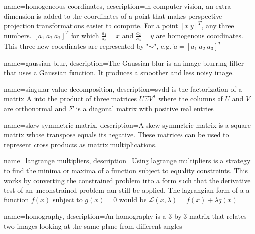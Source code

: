 
{	
	name={homogeneous coordinates}, 
	description={In computer vision, an extra dimension is added to the coordinates of a point that makes perspective projection transformations easier to compute. For a point $[x \ y]^T$, any three numbers, $[a_1 \ a_2 \ a_3]^T$ for which $\frac{a_1}{a_3} = x$ and $\frac{a_2}{a_3} = y$ are homogenous coordinates. This three new coordinates are represented by "$\sim$", e.g. $\widetilde{a} = [a_1 \ a_2 \ a_3]^T$}
}

{	
	name={gaussian blur}, 
	description={The Gaussian blur is an image-blurring filter that uses a Gaussian function. It produces a smoother and less noisy image.}
}

{
	name={singular value decomposition},
	description={\acrfull{svdd} is  the  factorization  of a matrix A into  the product of three matrices $U$$\Sigma$$V^T$   where the columns of $U$ and $V$ are orthonormal and $\Sigma$ is a diagonal matrix with positive real entries}
}

{
	name={skew symmetric matrix},
	description={A skew-symmetric matrix is a square matrix whose transpose equals its negative. These matrices can be used to represent cross products as matrix multiplications.}
}

{
	name={langrange multipliers},
	description={Using lagrange multipliers is a strategy to find the minima or maxima of a function subject to equality constraints. This works by converting the constrained problem into a form such that the derivative test of an unconstrained problem can still be applied. The lagrangian form of a a function $f(x)$ subject to $g(x) = 0$ would be $\mathcal{L}(x, \lambda)=f(x)+\lambda g(x)$}
}

{
	name={homography},
	description={An homography is a 3 by 3 matrix that relates two images looking at the same plane from different angles}
}
